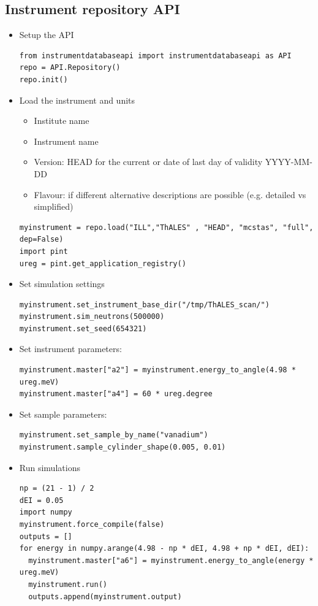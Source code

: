 \documentclass[11pt, a4paper]{article}
\begin{document}
\subsection{Instrument repository API}
  \begin{itemize}
  \item Setup the API
    \begin{lstlisting}
from instrumentdatabaseapi import instrumentdatabaseapi as API
repo = API.Repository()
repo.init()
\end{lstlisting}
    
\item Load the instrument and units
\begin{itemize}
\item Institute name
\item Instrument name
\item Version: HEAD for the current or date of last day of validity YYYY-MM-DD
\item Flavour: if different alternative descriptions are possible (e.g. detailed vs simplified)
\end{itemize}
  \begin{lstlisting}
myinstrument = repo.load("ILL","ThALES" , "HEAD", "mcstas", "full", dep=False)
import pint
ureg = pint.get_application_registry()
\end{lstlisting}
  \item Set simulation settings
    \begin{lstlisting}
myinstrument.set_instrument_base_dir("/tmp/ThALES_scan/")
myinstrument.sim_neutrons(500000)
myinstrument.set_seed(654321)
    \end{lstlisting}

  \item Set instrument parameters:
    \begin{lstlisting}
myinstrument.master["a2"] = myinstrument.energy_to_angle(4.98 * ureg.meV)
myinstrument.master["a4"] = 60 * ureg.degree
    \end{lstlisting}
  \item Set sample parameters:
    \begin{lstlisting}
myinstrument.set_sample_by_name("vanadium")
myinstrument.sample_cylinder_shape(0.005, 0.01)
\end{lstlisting}
\item Run simulations
    \begin{lstlisting}
np = (21 - 1) / 2
dEI = 0.05
import numpy
myinstrument.force_compile(false)
outputs = []
for energy in numpy.arange(4.98 - np * dEI, 4.98 + np * dEI, dEI):
  myinstrument.master["a6"] = myinstrument.energy_to_angle(energy * ureg.meV)
  myinstrument.run()
  outputs.append(myinstrument.output)
    \end{lstlisting}
  \end{itemize}



\end{document}
